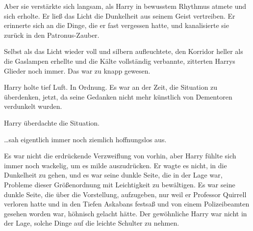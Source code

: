 Aber sie verstärkte sich langsam, als Harry in bewusstem Rhythmus atmete und sich erholte. Er ließ das Licht die Dunkelheit aus seinem Geist vertreiben. Er erinnerte sich an die Dinge, die er fast vergessen hatte, und kanalisierte sie zurück in den Patronus-Zauber.

Selbst als das Licht wieder voll und silbern aufleuchtete, den Korridor heller als die Gaslampen erhellte und die Kälte vollständig verbannte, zitterten Harrys Glieder noch immer. Das war zu knapp gewesen.

Harry holte tief Luft. In Ordnung. Es war an der Zeit, die Situation zu überdenken, jetzt, da seine Gedanken nicht mehr künstlich von Dementoren verdunkelt wurden.

Harry überdachte die Situation.

…sah eigentlich immer noch ziemlich hoffnungslos aus.

Es war nicht die erdrückende Verzweiflung von vorhin, aber Harry fühlte sich immer noch wackelig, um es milde auszudrücken. Er wagte es nicht, in die Dunkelheit zu gehen, und es war seine dunkle Seite, die in der Lage war, Probleme dieser Größenordnung mit Leichtigkeit zu bewältigen. Es war seine dunkle Seite, die über die Vorstellung, aufzugeben, nur weil er Professor Quirrell verloren hatte und in den Tiefen Askabans festsaß und von einem Polizeibeamten gesehen worden war, höhnisch gelacht hätte. Der gewöhnliche Harry war nicht in der Lage, solche Dinge auf die leichte Schulter zu nehmen.

